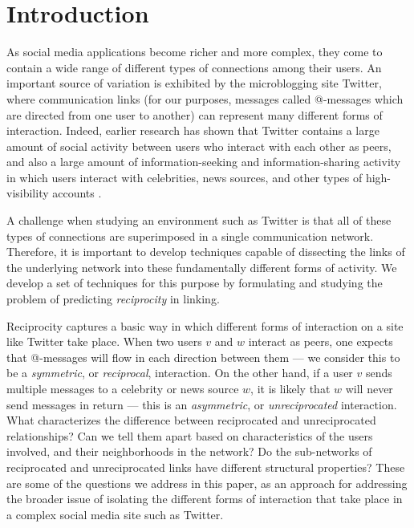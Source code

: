 \documentclass[conference]{IEEEtran}
\begin{document}
\section{Introduction}

As social media applications become richer and more complex,
they come to contain a wide range of different types of 
connections among their users.
An important source of variation is exhibited by the
microblogging site Twitter, where communication links
(for our purposes, messages called @-messages which are directed from one user to another)
can represent many different forms of interaction.
Indeed, earlier research has shown that Twitter contains
a large amount of social activity between users who interact
with each other as peers, and also a large amount of information-seeking
and information-sharing activity in which users interact with
celebrities, news sources, and other types of high-visibility accounts
\cite{kwak-what-is-twitter,romero-directed-closure}.

A challenge when studying an environment such as Twitter
is that all of these types of connections are superimposed 
in a single communication network.
Therefore, it is important to develop techniques capable of dissecting
the links of the underlying network into these fundamentally
different forms of activity.
We develop a set of techniques for this purpose
by formulating and studying the problem of predicting
{\em reciprocity} in linking.

Reciprocity captures a basic way in which different forms of
interaction on a site like Twitter take place.
When two users $v$ and $w$ interact as peers, one expects that @-messages
will flow in each direction between them --- we consider
this to be a {\em symmetric}, or {\em reciprocal}, interaction.
On the other hand, if a user $v$ sends multiple messages to a
celebrity or news source $w$, it is likely that $w$ will never
send messages in return --- this is an
{\em asymmetric}, or {\em unreciprocated} interaction.
What characterizes the difference between reciprocated and
unreciprocated relationships?  Can we tell them apart based on
characteristics of the users involved, and their neighborhoods
in the network?
Do the sub-networks of reciprocated and unreciprocated links have
different structural properties?
These are some of the questions we address in this paper, as an
approach for addressing the broader issue of isolating the different
forms of interaction that take place in a complex social media 
site such as Twitter.
\end{document}
